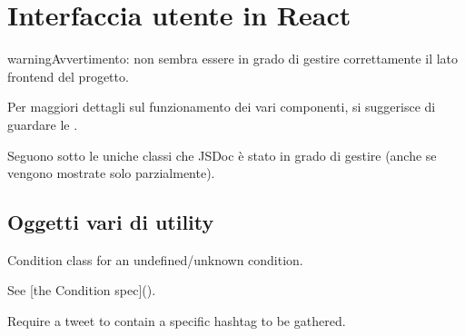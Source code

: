 \documentclass[letterpaper,10pt,italian]{sphinxmanual}
\begin{document}
\chapter{ \sphinxhyphen{} Interfaccia utente in React}
\label{\detokenize{code/frontend/index:nest-frontend-interfaccia-utente-in-react}}\label{\detokenize{code/frontend/index::doc}}
\begin{sphinxadmonition}{warning}{Avvertimento:}
\sphinxAtStartPar
{} non sembra essere in grado di gestire correttamente il lato frontend del progetto.

\sphinxAtStartPar
Per maggiori dettagli sul funzionamento dei vari componenti, si suggerisce di guardare le .

\sphinxAtStartPar
Seguono sotto le uniche classi che JSDoc è stato in grado di gestire (anche se vengono mostrate solo
parzialmente).
\end{sphinxadmonition}


\section{ \sphinxhyphen{} Oggetti vari di utility}
\label{\detokenize{code/frontend/index:objects-oggetti-vari-di-utility}}

\begin{fulllineitems}
\label{\detokenize{code/frontend/index:Condition}}
\sphinxAtStartPar
Condition class for an undefined/unknown condition.

\sphinxAtStartPar
See {[}the Condition spec{]}().

\end{fulllineitems}


\begin{fulllineitems}
\label{\detokenize{code/frontend/index:ConditionHashtag}}
\sphinxAtStartPar
Require a tweet to contain a specific hashtag to be gathered.

\end{fulllineitems}
\end{document}
